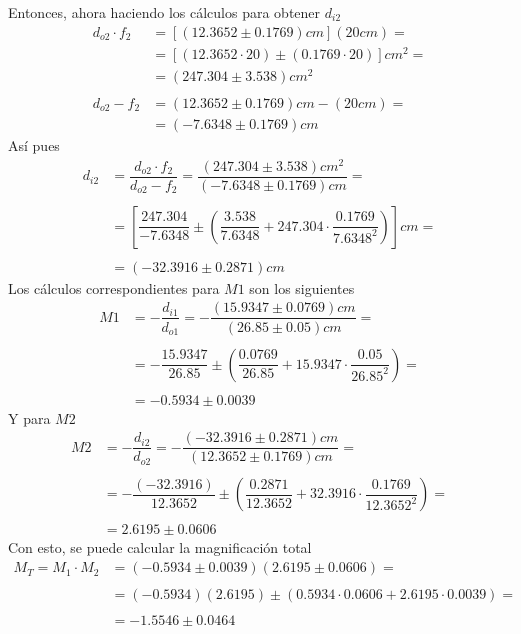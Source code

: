 \documentclass[10pt,a4paper]{article}
\begin{document}
Entonces, ahora haciendo los cálculos para obtener $d_{i2}$
\begin{align*}
	d_{o2}\cdot f_2&=[(12.3652\pm0.1769)cm](20cm)=\\
	&=\left[(12.3652\cdot20)\pm\left(0.1769\cdot20\right)\right]cm^2=\\
	&=(247.304\pm3.538)cm^2\\\\
	d_{o2}-f_2&=(12.3652\pm0.1769)cm-(20cm)=\\
	&=(-7.6348\pm0.1769)cm
\end{align*}
Así pues 
\begin{align*}
	d_{i2}&=\dfrac{d_{o2}\cdot f_2}{d_{o2}-f_2}=\dfrac{(247.304\pm3.538)cm^2}{(-7.6348\pm0.1769)cm}=\\\\
	&=\left[\dfrac{247.304}{-7.6348}\pm\left(\dfrac{3.538}{7.6348}+247.304\cdot\dfrac{0.1769}{7.6348^2}\right)\right]cm=\\\\
	&=(-32.3916\pm 0.2871)cm
\end{align*}
Los cálculos correspondientes para $M1$ son los siguientes
\begin{align*}
	M1&=-\dfrac{d_{i1}}{d_{o1}}=-\dfrac{(15.9347\pm0.0769)cm}{(26.85\pm 0.05) cm}=\\\\
	&=-\dfrac{15.9347}{26.85}\pm\left(\dfrac{0.0769}{26.85}+15.9347\cdot\dfrac{0.05}{26.85^2}\right)=\\\\
	&=-0.5934\pm0.0039 
\end{align*}
Y para $M2$
\begin{align*}
	M2&=-\dfrac{d_{i2}}{d_{o2}}=-\dfrac{(-32.3916\pm 0.2871) cm}{(12.3652\pm0.1769)cm}=\\\\
	&=-\dfrac{(-32.3916)}{12.3652}\pm\left(\dfrac{0.2871}{12.3652}+32.3916\cdot\dfrac{0.1769}{12.3652^2}\right)=\\\\
	&=2.6195\pm0.0606
\end{align*}
Con esto, se puede calcular la magnificación total
\begin{align*}
	M_T=M_1\cdot M_2&=(-0.5934\pm0.0039)(2.6195\pm0.0606)=\\\\
	&=(-0.5934)(2.6195)\pm\left(0.5934\cdot0.0606+2.6195\cdot0.0039\right)=\\\\
	&=-1.5546\pm0.0464 
\end{align*}
\end{document}
